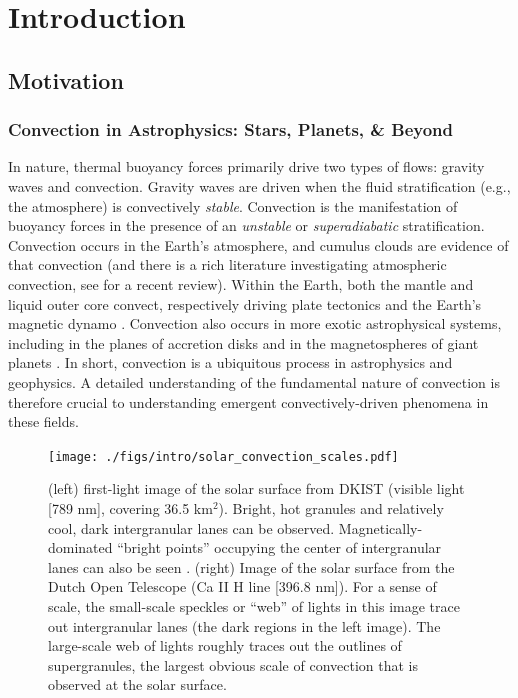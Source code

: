 \chapter{Introduction}
\label{introchap}

\section{Motivation}

\subsection{Convection in Astrophysics: Stars, Planets, \& Beyond}
\label{sct:convective_abundance}
In nature, thermal buoyancy forces primarily drive two types of flows: gravity waves and convection.
Gravity waves are driven when the fluid stratification (e.g., the atmosphere) is convectively \emph{stable}.
Convection is the manifestation of buoyancy forces in the presence of an \emph{unstable} or \emph{superadiabatic} stratification.
Convection occurs in the Earth's atmosphere, and cumulus clouds are evidence of that convection (and there is a rich literature investigating atmospheric convection, see \citet{yano2014} for a recent review).
Within the Earth, both the mantle \citep{schubert&all2001} and liquid outer core convect, respectively driving plate tectonics \citep{bercovici2003} and the Earth's magnetic dynamo \citep{christensen2011}.
Convection also occurs in more exotic astrophysical systems, including in the planes of accretion disks \citep{held&latter2018} and in the magnetospheres of giant planets \citep{thomsen&all2012}.
In short, convection is a ubiquitous process in astrophysics and geophysics.
A detailed understanding of the fundamental nature of convection is therefore crucial to understanding emergent convectively-driven phenomena in these fields.

\begin{figure}[t!]
\texttt{[image: ./figs/intro/solar\_convection\_scales.pdf]}
\caption[Images of solar granulation and supergranulation.]
{
	(left) first-light image of the solar surface from DKIST (visible light [789 nm], covering 36.5 km$^2$).
	Bright, hot granules and relatively cool, dark intergranular lanes can be observed.
	Magnetically-dominated ``bright points'' occupying the center of intergranular lanes can also be seen \citep{vankooten&cranmer2017}.
	(right) Image of the solar surface from the Dutch Open Telescope (Ca II H line [396.8 nm]).
	For a sense of scale, the small-scale speckles or ``web'' of lights in this image trace out intergranular lanes (the dark regions in the left image).
	The large-scale web of lights roughly traces out the outlines of supergranules, the largest obvious scale of convection that is observed at the solar surface.
	\label{fig:solar_convection_scales} 
}
\end{figure}



